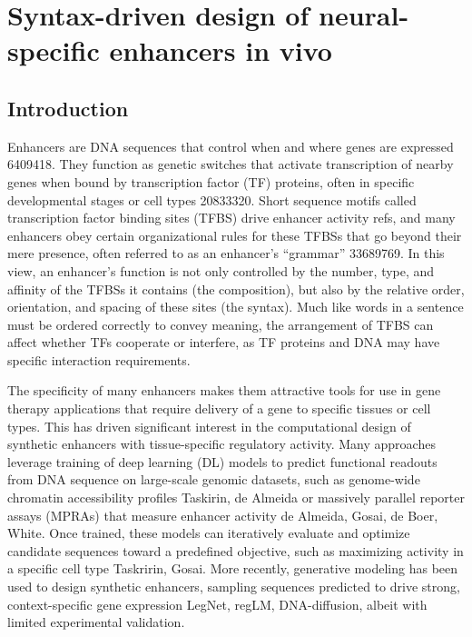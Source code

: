 \chapter{Syntax-driven design of neural-specific enhancers in vivo}
\label{chap:Syntax-driven design of neural-specific enhancers in vivo}

\section{Introduction}

Enhancers are DNA sequences that control when and where genes are expressed {6409418}. They function as genetic switches that activate transcription of nearby genes when bound by transcription factor (TF) proteins, often in specific developmental stages or cell types {20833320}. Short sequence motifs called transcription factor binding sites (TFBS) drive enhancer activity {refs}, and many enhancers obey certain organizational rules for these TFBSs that go beyond their mere presence, often referred to as an enhancer’s “grammar” {33689769}. In this view, an enhancer’s function is not only controlled by the number, type, and affinity of the TFBSs it contains (the composition), but also by the relative order, orientation, and spacing of these sites (the syntax). Much like words in a sentence must be ordered correctly to convey meaning, the arrangement of TFBS can affect whether TFs cooperate or interfere, as TF proteins and DNA may have specific interaction requirements.

The specificity of many enhancers makes them attractive tools for use in gene therapy applications that require delivery of a gene to specific tissues or cell types. This has driven significant interest in the computational design of synthetic enhancers with tissue-specific regulatory activity. Many approaches leverage training of deep learning (DL) models to predict functional readouts from DNA sequence on large-scale genomic datasets, such as genome-wide chromatin accessibility profiles {Taskirin, de Almeida} or massively parallel reporter assays (MPRAs) that measure enhancer activity {de Almeida, Gosai, de Boer, White}. Once trained, these models can iteratively evaluate and optimize candidate sequences toward a predefined objective, such as maximizing activity in a specific cell type {Taskririn, Gosai}. More recently, generative modeling has been used to design synthetic enhancers, sampling sequences predicted to drive strong, context-specific gene expression {LegNet, regLM, DNA-diffusion}, albeit with limited experimental validation.

